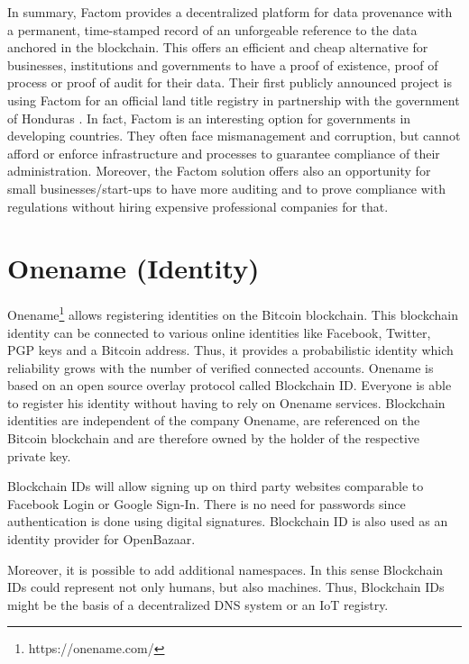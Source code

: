 In summary, Factom provides a decentralized platform for data provenance with a 
permanent, time-stamped record of an unforgeable reference to the data anchored 
in the blockchain. This offers an efficient and cheap alternative for businesses, 
institutions and governments to have a proof of existence, proof of process or 
proof of audit for their data. Their first publicly announced project is using 
Factom for an official land title registry in partnership with the government of 
Honduras \parencite{Chavez2015}. In fact, Factom is an interesting option for 
governments in developing countries. They often face mismanagement and corruption, 
but cannot afford or enforce infrastructure and processes to guarantee compliance 
of their administration. Moreover, the Factom solution offers also an opportunity 
for small businesses/start-ups to have more auditing and to prove compliance with 
regulations without hiring expensive professional companies for that.

\section{Onename (Identity)}
\label{sec:ecoonename}

Onename\footnote{https://onename.com/} allows registering identities on the Bitcoin blockchain. This blockchain 
identity can be connected to various online identities like Facebook, Twitter, 
PGP keys and a Bitcoin address. Thus, it provides a probabilistic identity which 
reliability grows with the number of verified connected accounts. Onename is based 
on an open source overlay protocol called Blockchain ID. Everyone is able to register 
his identity without having to rely on Onename services. Blockchain identities 
are independent of the company Onename, are referenced on the Bitcoin blockchain 
and are therefore owned by the holder of the respective private key.

Blockchain IDs will allow signing up on third party websites comparable to Facebook 
Login or Google Sign-In. There is no need for passwords since authentication is 
done using digital signatures. Blockchain ID is also used as an identity provider 
for OpenBazaar. 

Moreover, it is possible to add additional namespaces. In this sense Blockchain 
IDs could represent not only humans, but also machines. Thus, Blockchain IDs might 
be the basis of a decentralized DNS system or an IoT registry. 

